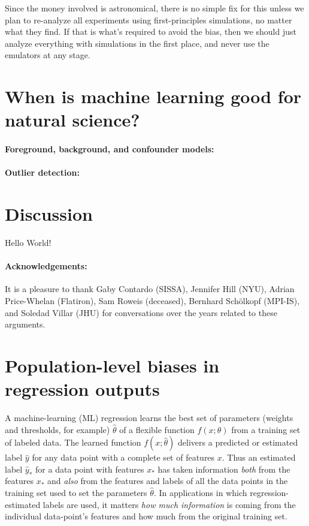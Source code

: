 \documentclass[11pt]{article}
\begin{document}
Since the money involved is astronomical, there is no simple fix for this unless we plan to re-analyze all experiments using first-principles simulations, no matter what they find.
If that is what's required to avoid the bias, then we should just analyze everything with simulations in the first place, and never use the emulators at any stage.

\section{When is machine learning good for natural science?}\label{sec:good}

\paragraph{Foreground, background, and confounder models:}

\paragraph{Outlier detection:}

\section{Discussion}\label{sec:discussion}

Hello World!

\paragraph{Acknowledgements:}
It is a pleasure to thank
  Gaby Contardo (SISSA),
  Jennifer Hill (NYU),
  Adrian Price-Whelan (Flatiron),
  Sam Roweis (deceased),
  Bernhard Sch\"olkopf (MPI-IS), and
  Soledad Villar (JHU)
for conversations over the years related to these arguments.

{\raggedright


}

\clearpage\appendix
\section{Population-level biases in regression outputs}\label{app:toy}
A machine-learning (ML) regression learns the best set of parameters (weights and thresholds, for example) $\hat{\theta}$ of a flexible function $f(x;\theta)$ from a training set of labeled data.
The learned function $f(x;\hat{\theta})$ delivers a predicted or estimated label $\hat{y}$ for any data point with a complete set of features $x$.
Thus an estimated label $\hat{y}_\ast$ for a data point with features $x_\ast$ has taken information \emph{both} from the features $x_\ast$ and \emph{also} from the features and labels of all the data points in the training set used to set the parameters $\hat{\theta}$.
In applications in which regression-estimated labels are used, it matters \emph{how much information} is coming from the individual data-point's features and how much from the original training set.
\end{document}
